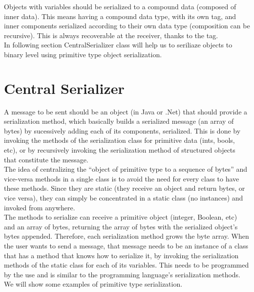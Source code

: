 Objects with variables should be serialized to a compound data (composed of inner data). This means having a compound data type,
 with its own tag, and inner components serialized according to their own data type (composition can be recursive).
 This is always recoverable at the receiver, thanks to the tag.\\

In following section CentralSerializer class will help us to seriliaze objects to binary level using primitive type
object serialization.\\


\section{Central Serializer}
\label{section:centralSerializer}

A message to be sent should be an object (in Java or .Net) that should provide a serialization method, which basically
builds a serialized message (an array of bytes) by sucessively adding each of its components, serialized. This is done by
invoking the methods of the serialization class for primitive data (ints, bools, etc), or by recursively invoking the
serialization method of structured objects that constitute the message.\\

The idea of centralizing the “object of primitive type to a sequence of bytes” and vice-versa methods in a single class
is to avoid the need for every class to have these methods. Since they are static (they receive an object and return bytes,
or vice versa), they can simply be concentrated in a static class (no instances) and invoked from anywhere.\\

The methods to serialize can receive a primitive object (integer, Boolean, etc) and an array of bytes, returning the array
of bytes with the serialized object’s bytes appended. Therefore, each serialization method grows the byte array. When the
user wants to send a message, that message needs to be an instance of a class that has a method that knows how to serialize it,
by invoking the serialization methods of the static class for each of its variables. This needs to be programmed by the use and
is similar to the programming language’s serialization methods.\\

We will show some examples of primitive type serialization.

